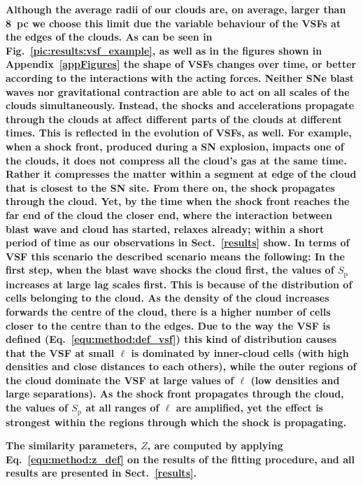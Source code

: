\textbf{
    Although the average radii of our clouds are, on average, larger than 8~pc we choose this limit due the variable behaviour of the VSFs at the edges of the clouds. 
    As can be seen in Fig.~\ref{pic:results:vsf_example}, as well as in the figures shown in Appendix~\ref{appFigures} the shape of VSFs changes over time, or better according to the interactions with the acting forces.
    Neither SNe blast waves nor gravitational contraction are able to act on all scales of the clouds simultaneously. 
    Instead, the shocks and accelerations propagate through the clouds at affect different parts of the clouds at different times.
    This is reflected in the evolution of VSFs, as well.
    For example, when a shock front, produced during a SN explosion, impacts one of the clouds, it does not compress all the cloud's gas at the same time.
    Rather it compresses the matter within a segment at edge of the cloud that is closest to the SN site.
    From there on, the shock propagates through the cloud.
    Yet, by the time when the shock front reaches the far end of the cloud the closer end, where the interaction between blast wave and cloud has started, relaxes already; within a short period of time as our observations in Sect.~\ref{results} show.
    In terms of VSF this scenario the described scenario means the following:
    In the first step, when the blast wave shocks the cloud first, the values of $S_\mathrm{p}$ increases at large lag scales first.
    This is because of the distribution of cells belonging to the cloud. 
    As the density of the cloud increases forwards the centre of the cloud, there is a higher number of cells closer to the centre than to the edges. 
    Due to the way the VSF is defined (Eq.~\ref{equ:method:def_vsf}) this kind of distribution causes that the VSF at small $\ell$ is dominated by inner-cloud cells (with high densities and close distances to each others), while the outer regions of the cloud dominate the VSF at large values of $\ell$ (low densities and large separations).
    As the shock front propagates through the cloud, the values of $S_\mathrm{p}$ at all ranges of $\ell$ are amplified, yet the effect is strongest within the regions through which the shock is propagating.
}

\textbf{
    The similarity parameters, $Z$, are computed by applying Eq.~\ref{equ:method:z_def} on the results of the fitting procedure, and all results are presented in Sect.~\ref{results}.
}

